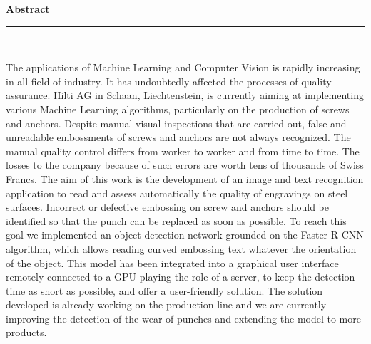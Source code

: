 \documentclass[12pt, french, a4paper]{article} %
\begin{document}
\clearpage
		
\newpage

\tableofcontents
\newpage

\thispagestyle{empty} 
    \begin{center}
		{ \huge \bfseries Abstract}\\
		\rule{\linewidth}{0.2 mm} \\[1.5 cm]
    \end{center}
    
  \par The applications of Machine Learning and Computer Vision is rapidly increasing in all field of industry. It has undoubtedly affected the processes of quality assurance. Hilti AG in Schaan, Liechtenstein, is currently aiming at implementing various Machine Learning algorithms, particularly on the production of screws and anchors. Despite manual visual inspections that are carried out, false and unreadable embossments of screws and anchors are not always recognized. The manual quality control differs from worker to worker and from time to time. The losses to the company because of such errors are worth tens of thousands of Swiss Francs. The aim of this work is the development of an image and text recognition application to read and assess automatically the quality of engravings on steel surfaces. Incorrect or defective embossing on screw and anchors should be identified so that the punch can be replaced as soon as possible. To reach this goal we implemented an object detection network grounded on the Faster R-CNN algorithm, which allows reading curved embossing text whatever the orientation of the object. This model has been integrated into a graphical user interface remotely connected to a GPU playing the role of a server, to keep the detection time as short as possible, and offer a user-friendly solution. The solution developed is already working on the production line and we are currently improving the detection of the wear of punches and extending the model to more products.
  

\clearpage
\newpage
\end{document}
